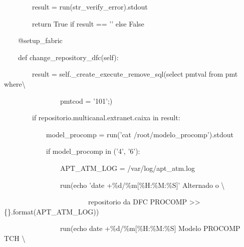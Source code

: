 {\ttfamily\color[rgb]{0.10980392,0.10980392,0.10980392}
    \ \ \ \ \ \ \ \ result = run(str\_verify\_error).stdout}

{\ttfamily\color[rgb]{0.10980392,0.10980392,0.10980392}
    \ \ \ \ \ \ \ \ return True if result == '{}' else False}


    \bigskip

{\ttfamily\color[rgb]{0.10980392,0.10980392,0.10980392}
    \ \ \ \ @setup\_fabric}

{\ttfamily\color[rgb]{0.10980392,0.10980392,0.10980392}
    \ \ \ \ def change\_repository\_dfc(self):}

{\ttfamily\color[rgb]{0.10980392,0.10980392,0.10980392}
    \ \ \ \ \ \ \ \ result = self.\_create\_execute\_remove\_sql({\textquotedbl}select pmtval from pmt
            where{\textbackslash}}

            {\ttfamily\color[rgb]{0.10980392,0.10980392,0.10980392}
            \ \ \ \ \ \ \ \ \ \ \ \ \ \ \ \ pmtcod = '101';{\textquotedbl})}

{\ttfamily\color[rgb]{0.10980392,0.10980392,0.10980392}
    \ \ \ \ \ \ \ \ if {\textquotedbl}repositorio.multicanal.extranet.caixa{\textquotedbl} in result:}

{\ttfamily\color[rgb]{0.10980392,0.10980392,0.10980392}
    \ \ \ \ \ \ \ \ \ \ \ \ model\_procomp = run('cat /root/modelo\_procomp').stdout}

{\ttfamily\color[rgb]{0.10980392,0.10980392,0.10980392}
    \ \ \ \ \ \ \ \ \ \ \ \ if model\_procomp in ('4', '6'):}

{\ttfamily\color[rgb]{0.10980392,0.10980392,0.10980392}
    \ \ \ \ \ \ \ \ \ \ \ \ \ \ \ \ APT\_ATM\_LOG = {\textquotedbl}/var/log/apt\_atm.log{\textquotedbl}}

{\ttfamily\color[rgb]{0.10980392,0.10980392,0.10980392}
    \ \ \ \ \ \ \ \ \ \ \ \ \ \ \ \ run({\textquotedbl}{\textquotedbl}{\textquotedbl}echo {\textquotedbl}'date
            +\%d/\%m[\%H:\%M:\%S]' Alternado o {\textbackslash}}

            {\ttfamily\color[rgb]{0.10980392,0.10980392,0.10980392}
            \ \ \ \ \ \ \ \ \ \ \ \ \ \ \ \ \ \ \ \ \ \ \ \ repositorio da DFC PROCOMP{\textquotedbl} {\textgreater}{\textgreater}
            \{\}{\textquotedbl}{\textquotedbl}{\textquotedbl}.format(APT\_ATM\_LOG))}

{\ttfamily\color[rgb]{0.10980392,0.10980392,0.10980392}
    \ \ \ \ \ \ \ \ \ \ \ \ \ \ \ \ run({\textquotedbl}{\textquotedbl}{\textquotedbl}echo
            {\textquotedbl}{\textasciigrave}date +\%d/\%m[\%H:\%M:\%S]{\textasciigrave} Modelo PROCOMP TCH{\textquotedbl}
            {\textbackslash}}

